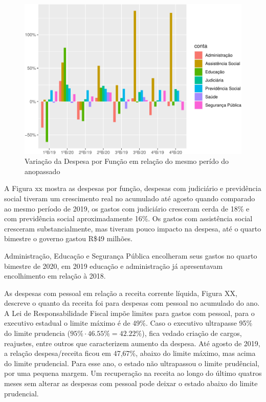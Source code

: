 \begin{figure}[h]
\caption{Variação da Despesa por Função em relação do mesmo perído do anopassado}
\includegraphics[width=\linewidth]{fig/unnamed-chunk-6-1.pdf}
\end{figure}
A Figura xx mostra as despesas por função, despesas com judiciário e
previdência social tiveram um crescimento real no acumulado até agosto
quando comparado ao mesmo período de 2019, os gastos com judiciário
cresceram cerda de 18\% e com previdência social aproximadamente 16\%.
Os gastos com assistência social cresceram substancialmente, mas tiveram
pouco impacto na despesa, até o quarto bimestre o governo gastou R\$49
milhões.

Administração, Educação e Segurança Pública encolheram seus gastos no
quarto bimestre de 2020, em 2019 educação e administração já
apresentavam encolhimento em relação à 2018.

As despesas com pessoal em relação a receita corrente líquida, Figura
XX, descreve o quanto da receita foi para despesas com pessoal no
acumulado do ano. A Lei de Responsabilidade Fiscal impõe limites para
gastos com pessoal, para o executivo estadual o limite máximo é de 49\%.
Caso o executivo ultrapasse 95\% do limite prudencia
(\(95\%\cdot46.55\%=42.22\%\)), fica vedado criação de cargos,
reajustes, entre outros que caracterizem aumento da despesa. Até agosto
de 2019, a relação despesa/receita ficou em 47,67\%, abaixo do limite
máximo, mas acima do limite prudencial. Para esse ano, o estado não
ultrapassou o limite prudêncial, por uma pequena margem. Um recuperação
na receita ao longo do último quatros meses sem alterar as despesas com
pessoal pode deixar o estado abaixo do limite prudencial.

